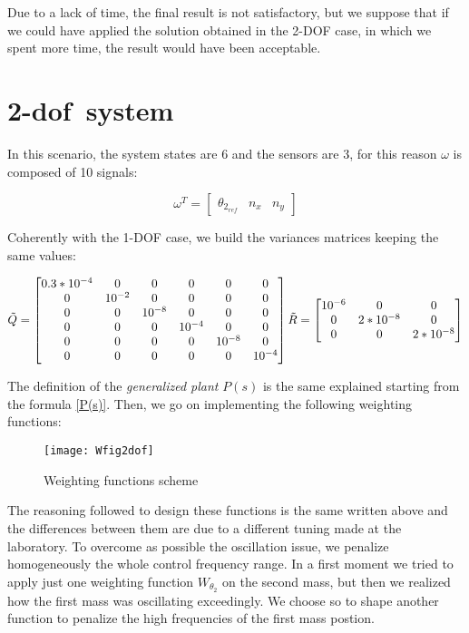 Due to a lack of time, the final result is not satisfactory, but we suppose that if we could have applied the solution obtained in the 2-DOF case, in which we spent more time, the result would have been acceptable.
\newpage
\section{\acrshort{2-dof}\ system}
In this scenario, the system states are 6 and the sensors are 3, for this reason $\omega$ is composed of 10 signals:

\begin{equation}
	\omega^{T} =
	\begin{bmatrix}
		\theta_{2_{ref}} & n_x & n_y
	\end{bmatrix}
\end{equation}

Coherently with the 1-DOF case, we build the variances matrices keeping the same values:

\begin{equation}
	\tilde{Q}=
	\begin{bmatrix}
		0.3*10^{-4} & 0 & 0 & 0 & 0 & 0\\
		0 & 10^{-2} & 0 & 0 & 0 & 0\\
		0 & 0 & 10^{-8} & 0 & 0 & 0 \\
		0 & 0 & 0 & 10^{-4} & 0 & 0 \\
		0 & 0 & 0 & 0 & 10^{-8} & 0 \\
		0 & 0 & 0 & 0 & 0 & 10^{-4}
	\end{bmatrix}
	\\
	\tilde{R}=
	\begin{bmatrix}
		10^{-6} & 0 & 0\\
		0 & 2*10^{-8} & 0 \\
		0 & 0 & 2*10^{-8} 
	\end{bmatrix}	
\end{equation}

The definition of the \textit{generalized plant} $P(s)$ is the same explained starting from the formula \ref{P(s)}. Then, we go on implementing the following weighting functions:

\begin{figure*}[h]
	\centering
	\texttt{[image: Wfig2dof]}
	\caption{Weighting functions scheme}
	\label{Weighting functions scheme2dof}
\end{figure*}

The reasoning followed to design these functions is the same written above and the differences between them are due to a different tuning made at the laboratory. To overcome as possible the oscillation issue, we penalize homogeneously the whole control frequency range. In a first moment we tried to apply just one weighting function $W_{\theta_{2}}$ on the second mass, but then we realized how the first mass was oscillating exceedingly. We choose so to shape another function to penalize the high frequencies of the first mass postion.

